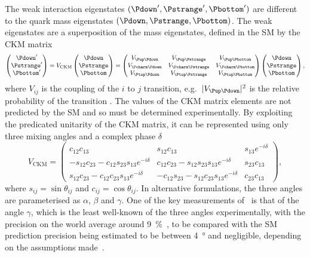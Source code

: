 The weak interaction eigenstates $(\Pdown', \Pstrange', \Pbottom')$ 
are different to the quark mass eigenstates $(\Pdown, \Pstrange, \Pbottom)$.
The weak eigenstates are a superposition of the mass eigenstates, defined in 
the SM by the \ac{CKM} matrix
\begin{equation}
  \begin{pmatrix} \Pdown' \\ \Pstrange' \\ \Pbottom' \end{pmatrix}
  =
  V_{\text{CKM}}\begin{pmatrix} \Pdown \\ \Pstrange \\ \Pbottom \end{pmatrix}
  =
  \begin{pmatrix}
    \Vud & \Vus & \Vub \\
    \Vcd & \Vcs & \Vcb \\
    \Vtd & \Vts & \Vtb
  \end{pmatrix}
  \begin{pmatrix} \Pdown \\ \Pstrange \\ \Pbottom \end{pmatrix},
\end{equation}
where $V_{ij}$ is the coupling of the $i$ to $j$ transition, e.g.\ $|\Vud|^{2}$ is 
the relative probability of the transition \decay{\Pdown}{\Pup}.
The values of the \ac{CKM} matrix elements are not predicted by the \ac{SM} and 
so must be determined experimentally.
By exploiting the predicated unitarity of the \ac{CKM} matrix, it can be 
represented using only three mixing angles and a complex phase $\delta$
\begin{equation}
  V_{\textrm{CKM}} =
  \begin{pmatrix}
    c_{12}c_{13} & s_{12}c_{13} & s_{13}e^{-i\delta} \\
    -s_{12}c_{23} - c_{12}s_{23}s_{13}e^{-i\delta} & c_{12}c_{23} - s_{12}s_{23}s_{13}e^{-i\delta} & s_{23}c_{13} \\
    s_{12}c_{23} - c_{12}c_{23}s_{13}e^{-i\delta} & -c_{12}s_{23} - s_{12}c_{23}s_{13}e^{-i\delta} & c_{23}c_{13}
  \end{pmatrix},
\end{equation}
where $s_{ij} = \sin{\theta_{ij}}$ and $c_{ij} = \cos{\theta_{ij}}$.
In alternative formulations, the three angles are parameterised as $\alpha$, $\beta$ and $\gamma$.
One of the key measurements of \lhcb\ is that of the angle $\gamma$, which is 
the least well-known of the three angles experimentally, with the precision on 
the world average around \SI{9}{\percent}~\cite{LHCb-CONF-2016-001}, to be 
compared with the \ac{SM} prediction precision being estimated to be between 
\SI{4}{\degree} and negligible, depending on the assumptions 
made~\cite{Brod:2013sga,Brod:2014bfa}.

